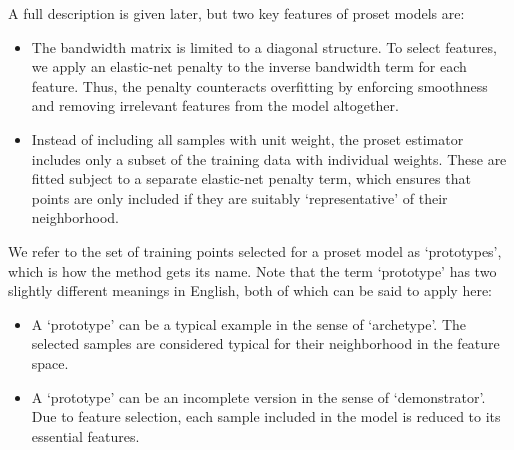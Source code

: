 A full description is given later, but two key features of proset models are:
%
\begin{itemize}
\item The bandwidth matrix is limited to a diagonal structure.
To select features, we apply an elastic-net penalty to the inverse bandwidth term for each feature.
Thus, the penalty counteracts overfitting by enforcing smoothness and removing irrelevant features from the model altogether.
%
\item Instead of including all samples with unit weight, the proset estimator includes only a subset of the training data with individual weights.
These are fitted subject to a separate elastic-net penalty term, which ensures that points are only included if they are suitably `representative' of their neighborhood.
\end{itemize}
%
We refer to the set of training points selected for a proset model as `prototypes', which is how the method gets its name.
Note that the term `prototype' has two slightly different meanings in English, both of which can be said to apply here:
%
\begin{itemize}
\item A `prototype' can be a typical example in the sense of `archetype'.
The selected samples are considered typical for their neighborhood in the feature space.
%
\item A `prototype' can be an incomplete version in the sense of `demonstrator'.
Due to feature selection, each sample included in the model is reduced to its essential features.
\end{itemize}
%
